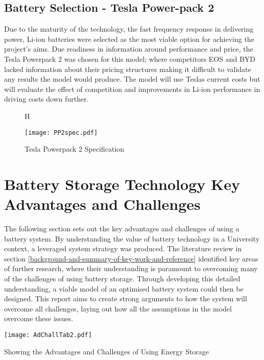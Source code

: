 \subsection{Battery Selection - Tesla Power-pack
2}\label{battery-selection---tesla-power-pack-2}

Due to the maturity of the technology, the fast frequency response in
delivering power, Li-ion batteries were selected as the most viable
option for achieving the project's aims. Due readiness in information
around performance and price, the Tesla Powerpack 2 was chosen for this
model; where competitors EOS and BYD lacked information about their
pricing structures making it difficult to validate any results the model
would produce. The model will use Teslas current costs but will evaluate
the effect of competition and improvements in Li-ion performance in
driving costs down further.

\begin{figure}{H}
\caption{Tesla Powerpack 2 Specification}
  \centering
     \texttt{[image: PP2spec.pdf]}
\end{figure}

\section{Battery Storage Technology Key Advantages and
Challenges}\label{battery-storage-technology-key-advantages-and-challenges}

The following section sets out the key advantages and challenges of
using a battery system. By understanding the value of battery technology
in a University context, a leveraged system strategy was produced. The
literature review in section
\ref{background-and-summary-of-key-work-and-reference} identified key
areas of further research, where their understanding is paramount to
overcoming many of the challenges of using battery storage. Through
developing this detailed understanding, a viable model of an optimised
battery system could then be designed. This report aims to create strong
arguments to how the system will overcome all challenges, laying out how
all the assumptions in the model overcome these issues.

\begin{table}[H]
\centering
\texttt{[image: AdChallTab2.pdf]}
\caption{Showing the Advantages and Challenges of Using Energy Storage}
\label{AdChalltab}
\end{table}


